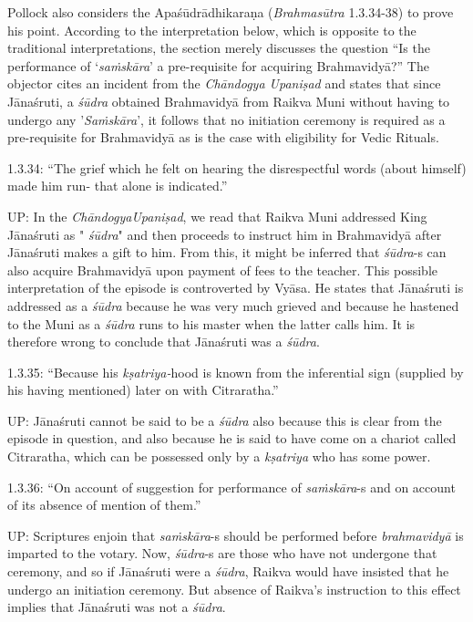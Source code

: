 Pollock also considers the Apaśūdrādhikaraṇa (\textit{Brahmasūtra} 1.3.34-38) to prove his point. According to the interpretation below, which is opposite to the traditional interpretations, the section merely discusses the question “Is the performance of ‘\textit{saṁskāra}’ a pre-requisite for acquiring Brahmavidyā?” The objector cites an incident from the \textit{Chāndogya Upaniṣad} and states that since Jānaśruti, a \textit{śūdra} obtained Brahmavidyā from Raikva Muni without having to undergo any '\textit{Saṁskāra}', it follows that no initiation ceremony is required as a pre-requisite for Brahmavidyā as is the case with eligibility for Vedic Rituals.

1.3.34: “The grief which he felt on hearing the disrespectful words (about himself) made him run- that alone is indicated.”

UP: In the \textit{ChāndogyaUpaniṣad}, we read that Raikva Muni addressed King Jānaśruti as "\textit{ śūdra}" and then proceeds to instruct him in Brahmavidyā after Jānaśruti makes a gift to him. From this, it might be inferred that \textit{śūdra}-s can also acquire Brahmavidyā upon payment of fees to the teacher. This possible interpretation of the episode is controverted by Vyāsa. He states that Jānaśruti is addressed as a \textit{śūdra} because he was very much grieved and because he hastened to the Muni as a \textit{śūdra} runs to his master when the latter calls him. It is therefore wrong to conclude that Jānaśruti was a \textit{śūdra}.

1.3.35: “Because his \textit{kṣatriya-}hood is known from the inferential sign (supplied by his having mentioned) later on with Citraratha.”

UP: Jānaśruti cannot be said to be a \textit{śūdra} also because this is clear from the episode in question, and also because he is said to have come on a chariot called Citraratha, which can be possessed only by a \textit{kṣatriya} who has some power.

1.3.36: “On account of suggestion for performance of \textit{saṁskāra}-s and on account of its absence of mention of them.”

UP: Scriptures enjoin that \textit{saṁskāra}-s should be performed before \textit{brahmavidyā} is imparted to the votary. Now, \textit{śūdra}-s are those who have not undergone that ceremony, and so if Jānaśruti were a \textit{śūdra}, Raikva would have insisted that he undergo an initiation ceremony. But absence of Raikva's instruction to this effect implies that Jānaśruti was not a \textit{śūdra}.

